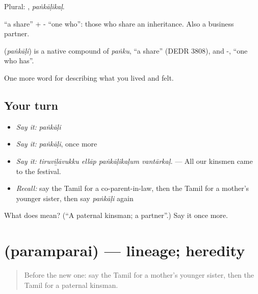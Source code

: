 Plural: , \emph{paṅkāḷikaḷ}.

 \textquotedblleft{}a share\textquotedblright{} + - \textquotedblleft{}one who\textquotedblright{}: those who share an inheritance. Also a business partner.

\begin{cousinweb}
\textbf{} (\emph{paṅkāḷi}) is a native compound of  \emph{paṅku}, \textquotedblleft{}a share\textquotedblright{} (DEDR 3808), and -, \textquotedblleft{}one who has\textquotedblright{}.
\end{cousinweb}

\begin{grammarlens}[title={What you've built}]
One more word for describing what you lived and felt.
\end{grammarlens}

\subsection*{Your turn}
\begin{itemize}
\raggedright
  \item \emph{Say it:} \emph{paṅkāḷi}
  \item \emph{Say it:} \emph{paṅkāḷi}, once more
  \item \emph{Say it:} \emph{tiruviḻāvukku ellāp paṅkāḷikaḷum vantārkaḷ.} — All our kinsmen came to the festival.
  \item \emph{Recall:} say the Tamil for a co-parent-in-law, then the Tamil for a mother’s younger sister, then say \emph{paṅkāḷi} again
\end{itemize}

\begin{tcolorbox}[breakable,colback=teal!4,colframe=teal!35!black,title={Before you move on}]
What does  mean? (\textquotedblleft{}A paternal kinsman; a partner\textquotedblright{}.) Say it once more.
\end{tcolorbox}
\section[\texorpdfstring{\ta{பரம்பரை} (paramparai)}{பரம்பரை (paramparai)}]{ (paramparai) — lineage; heredity}

\label{lesson:TA-C494-paramparai}



\begin{quote}
Before the new one: say the Tamil for a mother’s younger sister, then the Tamil for a paternal kinsman.
\end{quote}


